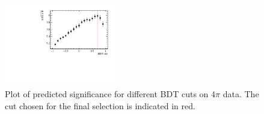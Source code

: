 \begin{figure}
\centering
\includegraphics[width=0.45\textwidth]{ANA_resources/Plots/Selection/BDT/optimisation/pipipipi_significance_run2.pdf}
\caption{Plot of predicted significance for different BDT cuts on $4\pi$ data. The cut chosen for the final selection is indicated in red.}
\label{fig:BDT_sig_pipipipi}
\end{figure}
